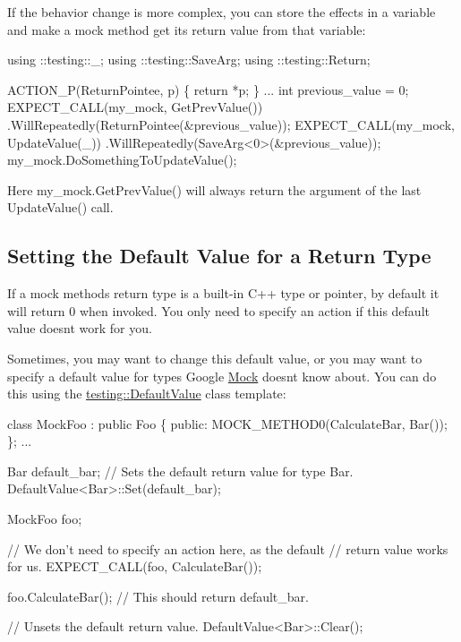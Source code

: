 If the behavior change is more complex, you can store the effects in a variable and make a mock method get its return value from that variable\+:


\begin{DoxyCode}
using ::testing::\_;
using ::testing::SaveArg;
using ::testing::Return;

ACTION\_P(ReturnPointee, p) \{ return *p; \}
...
  int previous\_value = 0;
  EXPECT\_CALL(my\_mock, GetPrevValue())
      .WillRepeatedly(ReturnPointee(&previous\_value));
  EXPECT\_CALL(my\_mock, UpdateValue(\_))
      .WillRepeatedly(SaveArg<0>(&previous\_value));
  my\_mock.DoSomethingToUpdateValue();
\end{DoxyCode}


Here {\ttfamily my\+\_\+mock.\+Get\+Prev\+Value()} will always return the argument of the last {\ttfamily Update\+Value()} call.

\subsection*{Setting the Default Value for a Return Type}

If a mock method\textquotesingle{}s return type is a built-\/in C++ type or pointer, by default it will return 0 when invoked. You only need to specify an action if this default value doesn\textquotesingle{}t work for you.

Sometimes, you may want to change this default value, or you may want to specify a default value for types Google \hyperlink{class_mock}{Mock} doesn\textquotesingle{}t know about. You can do this using the {\ttfamily \hyperlink{classtesting_1_1_default_value}{testing\+::\+Default\+Value}} class template\+:


\begin{DoxyCode}
class MockFoo : public Foo \{
 public:
  MOCK\_METHOD0(CalculateBar, Bar());
\};
...

  Bar default\_bar;
  // Sets the default return value for type Bar.
  DefaultValue<Bar>::Set(default\_bar);

  MockFoo foo;

  // We don't need to specify an action here, as the default
  // return value works for us.
  EXPECT\_CALL(foo, CalculateBar());

  foo.CalculateBar();  // This should return default\_bar.

  // Unsets the default return value.
  DefaultValue<Bar>::Clear();
\end{DoxyCode}


